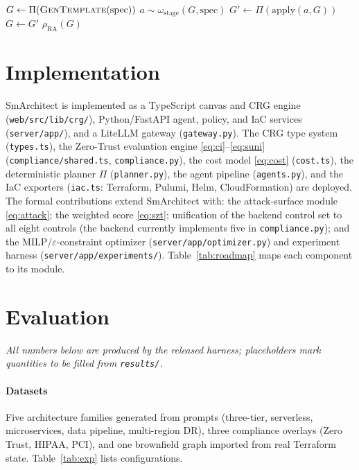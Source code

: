\documentclass[journal]{IEEEtran}
\theoremstyle{plain}
\theoremstyle{definition}
\newcommand{\G}{G}
\newcommand{\code}[1]{\texttt{\small #1}}
\begin{document}
\begin{algorithm}[t]
\caption{$\textsc{AgentSynthesize}(\text{spec})$ --- neuro-symbolic loop}
\label{alg:agent}
\begin{algorithmic}[1]
\State $\G\gets\Pi(\textsc{GenTemplate}(\text{spec}))$
  \State $a\sim\omega_{\text{stage}}(\G,\text{spec})$ 
  \State $\G'\gets\Pi(\text{apply}(a,\G))$ 
  \If{$\textsc{HumanApproves}(\G,\G')$} $\G\gets\G'$ \EndIf
\EndFor
\State \Return $\rho_{\mathrm{RA}}(\G)$ 
\end{algorithmic}
\end{algorithm}

\section{Implementation}\label{sec:impl}
SmArchitect is implemented as a TypeScript canvas and CRG engine
(\code{web/src/lib/crg/}), Python/FastAPI agent, policy, and IaC services
(\code{server/app/}), and a LiteLLM gateway (\code{gateway.py}). The CRG type
system (\code{types.ts}), the Zero-Trust evaluation engine \eqref{eq:ci}--\eqref{eq:suni}
(\code{compliance/shared.ts}, \code{compliance.py}), the cost model
\eqref{eq:cost} (\code{cost.ts}), the deterministic planner $\Pi$
(\code{planner.py}), the agent pipeline (\code{agents.py}), and the IaC exporters
(\code{iac.ts}: Terraform, Pulumi, Helm, CloudFormation) are deployed. The
formal contributions extend SmArchitect with: the attack-surface module
\eqref{eq:attack}; the weighted score \eqref{eq:szt}; unification of the backend
control set to all eight controls (the backend currently implements five in
\code{compliance.py}); and the MILP/$\varepsilon$-constraint optimizer
(\code{server/app/optimizer.py}) and experiment harness
(\code{server/app/experiments/}). Table~\ref{tab:roadmap} maps each component
to its module.

\section{Evaluation}\label{sec:eval}
\emph{All numbers below are produced by the released harness; placeholders mark
quantities to be filled from \code{results/}.}

\paragraph{Datasets} Five architecture families generated from prompts
(three-tier, serverless, microservices, data pipeline, multi-region DR), three
compliance overlays (Zero Trust, HIPAA, PCI), and one brownfield graph imported
from real Terraform state. Table~\ref{tab:exp} lists configurations.
\end{document}
